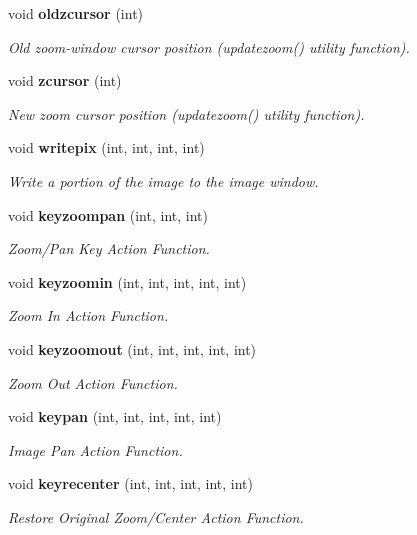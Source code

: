 \begin{CompactItemize}
\item 
void {\bf oldzcursor} (int)
\begin{CompactList}\small\item\em Old zoom-window cursor position (updatezoom() utility function). \item\end{CompactList}\item 
void {\bf zcursor} (int)
\begin{CompactList}\small\item\em New zoom cursor position (updatezoom() utility function). \item\end{CompactList}\item 
void {\bf writepix} (int, int, int, int)
\begin{CompactList}\small\item\em Write a portion of the image to the image window. \item\end{CompactList}\item 
void {\bf keyzoompan} (int, int, int)
\begin{CompactList}\small\item\em Zoom/Pan Key Action Function. \item\end{CompactList}\item 
void {\bf keyzoomin} (int, int, int, int, int)
\begin{CompactList}\small\item\em Zoom In Action Function. \item\end{CompactList}\item 
void {\bf keyzoomout} (int, int, int, int, int)
\begin{CompactList}\small\item\em Zoom Out Action Function. \item\end{CompactList}\item 
void {\bf keypan} (int, int, int, int, int)
\begin{CompactList}\small\item\em Image Pan Action Function. \item\end{CompactList}\item 
void {\bf keyrecenter} (int, int, int, int, int)
\begin{CompactList}\small\item\em Restore Original Zoom/Center Action Function. \item\end{CompactList}\item 

\end{CompactItemize}
